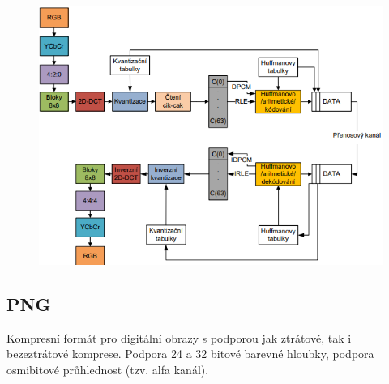 \begin{figure}[ht]
    \centering
    \includegraphics[width=0.65\linewidth]{MPC-ZMD//images/jpeg.png}
\end{figure}
\FloatBarrier

\subsection{PNG}

Kompresní formát pro digitální obrazy s podporou jak ztrátové, tak i bezeztrátové komprese. Podpora 24 a 32 bitové barevné hloubky, podpora osmibitové průhlednost (tzv. alfa kanál).

